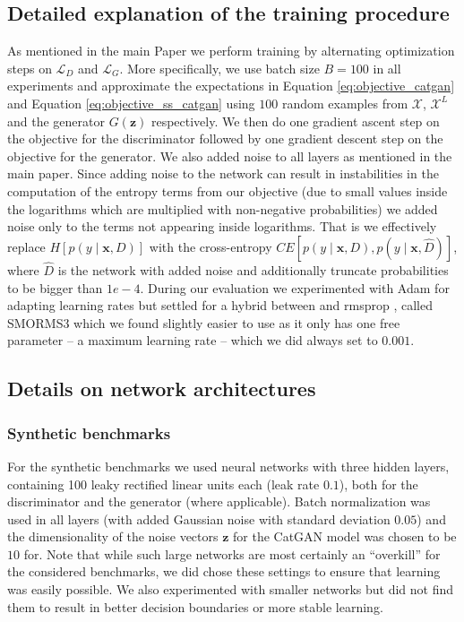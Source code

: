 \documentclass{article} \usepackage{iclr2016_conference,times}
\newcommand{\bx}{\mathbf{x}}
\newcommand{\bz}{\mathbf{z}}
\begin{document}
\begin{appendix}
\section{Detailed explanation of the training procedure}
As mentioned in the main Paper we perform training by alternating
optimization steps on $\mathcal{L}_D$ and $\mathcal{L}_G$. More
specifically, we use batch size $B=100$ in all experiments and
approximate the expectations in Equation \eqref{eq:objective_catgan}
and Equation \eqref{eq:objective_ss_catgan} using $100$ random
examples from $\mathcal{X}$, $\mathcal{X}^L$ and the generator
$G(\bz)$ respectively. We then do one gradient ascent step on the
objective for the discriminator followed by one gradient descent step
on the objective for the generator. We also added noise to all layers
as mentioned in the main paper. Since adding noise to the network can
result in instabilities in the computation of the entropy terms from
our objective (due to small values inside the logarithms which are
multiplied with non-negative probabilities) we added noise only to the
terms not appearing inside logarithms. That is we effectively replace
$H[p(y \mid \bx, D)]$ with the cross-entropy
$CE[p(y \mid \bx, D), p(y \mid \bx, \hat{D})]$, where $\hat{D}$ is the
network with added noise and additionally truncate probabilities to be
bigger than $1e-4$.  During our evaluation we experimented with Adam
\citep{Kingma_2015} for adapting learning rates but settled for a
hybrid between \citep{Schaul2013pesky} and rmsprop
\citep{Tieleman2012}, called SMORMS3 \citep{Funk_2015} which we found
slightly easier to use as it only has one free parameter -- a maximum
learning rate -- which we did always set to $0.001$.

\subsection{Details on network architectures}
\subsubsection{Synthetic benchmarks}
For the synthetic benchmarks we used neural networks with three hidden
layers, containing 100 leaky rectified linear units each (leak rate
$0.1$), both for the discriminator and the generator (where
applicable). Batch normalization was used in all layers (with added
Gaussian noise with standard deviation $0.05$) and the dimensionality
of the noise vectors $\bz$ for the CatGAN model was chosen to be $10$
for. Note that while such large networks are most certainly an
``overkill'' for the considered benchmarks, we did chose these
settings to ensure that learning was easily possible. We also
experimented with smaller networks but did not find them to result in
better decision boundaries or more stable learning.


\end{appendix}
\end{document}

